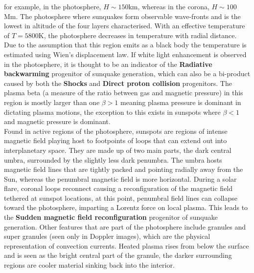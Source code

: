 for example, in the photosphere, $H\sim150$km, whereas in the corona, $H\sim100$Mm. The photosphere where sunquakes form observable wave-fronts and is the lowest in altitude of the four layers characterised. With an effective temperature of $T=5800$K, the photosphere decreases in temperature with radial distance. Due to the assumption that this region emits as a black body the temperature is estimated using Wien's displacement law. If white light enhancement is observed in the photosphere, it is thought to be an indicator of the \textbf{Radiative backwarming} progenitor of sunquake generation, which can also be a bi-product caused by both the \textbf{Shocks} and \textbf{Direct proton collision} progenitors. The plasma beta (a measure of the ratio between gas and magnetic pressure) in this region is mostly larger than one $\beta >1$ meaning plasma pressure is dominant in dictating plasma motions, the exception to this exists in sunspots where $\beta<1$ and magnetic pressure is dominant. \\ 

Found in active regions of the photosphere, sunspots are regions of intense magnetic field playing host to footpoints of loops that can extend out into interplanetary space. They are made up of two main parts, the dark central umbra, surrounded by the slightly less dark penumbra. The umbra hosts magnetic field lines that are tightly packed and pointing radially away from the Sun, whereas the penumbral magnetic field is more horizontal. During a solar flare, coronal loops reconnect causing a reconfiguration of the magnetic field tethered at sunspot locations, at this point, penumbral field lines can collapse toward the photosphere, imparting a Lorentz force on local plasma. This leads to the \textbf{Sudden magnetic field reconfiguration} progenitor of sunquake generation. Other features that are part of the photosphere include granules and super granules (seen only in Doppler images), which are the physical representation of convection currents. Heated plasma rises from below the surface and is seen as the bright central part of the granule, the darker surrounding regions are cooler material sinking back into the interior. \\

